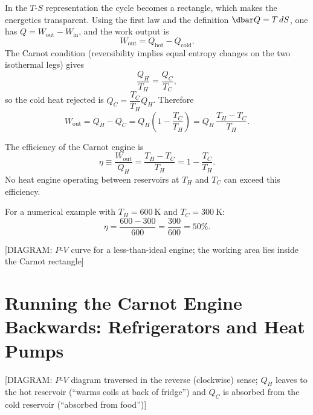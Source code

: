 In the $T$-$S$ representation the cycle becomes a rectangle, which makes the energetics transparent. Using the first law and the definition $\dbar Q = T\,dS$, one has $Q = W_{\text{out}} - W_{\text{in}}$, and the work output is
\begin{equation}
    W_{\text{out}} = Q_{\text{hot}} - Q_{\text{cold}}.
\end{equation}
The Carnot condition (reversibility implies equal entropy changes on the two isothermal legs) gives
\begin{equation}
    \frac{Q_H}{T_H} = \frac{Q_C}{T_C},
\end{equation}
so the cold heat rejected is $Q_C = \dfrac{T_C}{T_H} Q_H$. Therefore
\begin{equation}
    W_{\text{out}} = Q_H - Q_C = Q_H\!\left(1 - \frac{T_C}{T_H}\right) = Q_H\,\frac{T_H - T_C}{T_H}.
\end{equation}

\begin{theorem}
The efficiency of the Carnot engine is
\begin{equation}
    \eta \equiv \frac{W_{\text{out}}}{Q_H} = \frac{T_H - T_C}{T_H} = 1 - \frac{T_C}{T_H}.
\end{equation}
No heat engine operating between reservoirs at $T_H$ and $T_C$ can exceed this efficiency.
\end{theorem}

For a numerical example with $T_H = 600\ \mathrm{K}$ and $T_C = 300\ \mathrm{K}$:
\begin{equation}
    \eta = \frac{600 - 300}{600} = \frac{300}{600} = 50\%.
\end{equation}

\begin{center}[DIAGRAM: $P$-$V$ curve for a less-than-ideal engine; the working area lies inside the Carnot rectangle]\end{center}

\section{Running the Carnot Engine Backwards: Refrigerators and Heat Pumps}

\begin{center}[DIAGRAM: $P$-$V$ diagram traversed in the reverse (clockwise) sense; $Q_H$ leaves to the hot reservoir (``warms coils at back of fridge'') and $Q_C$ is absorbed from the cold reservoir (``absorbed from food'')]\end{center}

